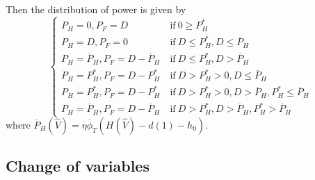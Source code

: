 \documentclass[12pt]{article}
\theoremstyle{definition}
\theoremstyle{remark}
\begin{document}
Then the distribution of power is given by
\begin{equation*}
\begin{cases}
P_H=0,P_F=D\ &\text{if}\ 0\geq P^*_H\\
P_H=D,P_F=0\ &\text{if}\ D\leq P_H^*,D\leq\overline{P}_H\\
P_H=\overline{P}_H,P_F=D-\overline{P}_H\ &\text{if}\ D\leq P_H^*,D>\overline{P}_H\\
P_H=P_H^*,P_F=D-P_H^*\ &\text{if}\ D>P_H^*>0,D\leq\overline{P}_H\\
P_H=P_H^*,P_F=D-P_H^*\ &\text{if}\ D>P_H^*>0,D>\overline{P}_H,P_H^*\leq\overline{P}_H\\
P_H=\overline{P}_H,P_F=D-\overline{P}_H\ &\text{if}\ D>P_H^*,D>\overline{P}_H,P_H^*>\overline{P}_H
\end{cases}
\end{equation*}
where $\overline{P}_H(\hat{V})=\eta\overline{\phi}_T(H(\hat{V})-d(1)-h_0)$.

\subsection{Change of variables}
\end{document}
